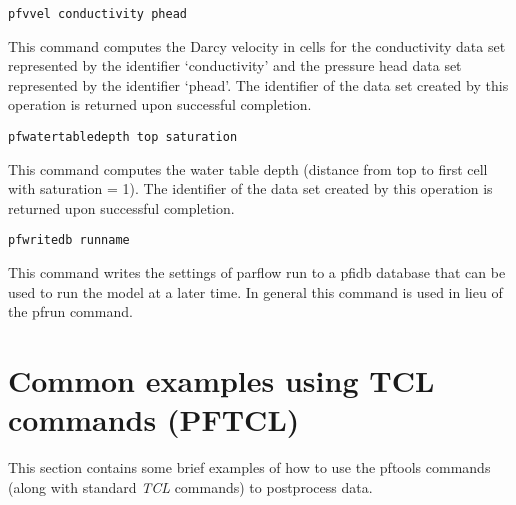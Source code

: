 \begin{description}
\item{\begin{verbatim}pfvvel conductivity phead\end{verbatim}}
This command computes the Darcy velocity in cells for the conductivity
data set represented by the identifier `conductivity' and the pressure
head data set represented by the identifier `phead'.  The identifier
of the data set created by this operation is returned upon successful
completion.

\item{\begin{verbatim}pfwatertabledepth top saturation \end{verbatim}}
 This command computes the water table depth (distance from top to
 first cell with saturation = 1).  The identifier of the data set
 created by this operation is returned upon successful completion.


\item{\begin{verbatim}pfwritedb runname\end{verbatim}}
This command writes the settings of parflow run to a pfidb database that
can be used to run the model at a later time. In general this command is used in lieu of the pfrun command.

\end{description}

\section{Common examples using \parflow{} TCL commands (PFTCL) }
\label{common_pftcl}
This section contains some brief examples of how to use the pftools commands (along with standard \emph{TCL} commands) to postprocess data.

